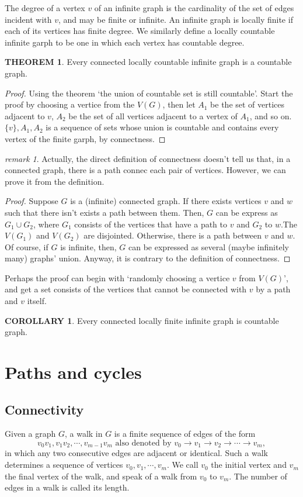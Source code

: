 \documentclass[a4paper,11pt]{article}%
\theoremstyle{remark}
\newtheorem*{remark}{remark}
\theoremstyle{definition}
\newtheorem{theorem}{THEOREM}[section]
\theoremstyle{definition}
\newtheorem{corollary}{COROLLARY}[section]
\theoremstyle{definition}
\theoremstyle{definition}
\theoremstyle{plain}
\theoremstyle{definition}
\begin{document}
The degree of a vertex $v$ of an infinite graph is the cardinality of the set 
of edges incident with $v$, and may be finite or infinite. An infinite graph 
is locally finite if each of its vertices has finite degree. We similarly define 
a locally countable infinite garph to be one in which each vertex has countable 
degree.
\begin{theorem}
    Every connected locally countable infinite graph is a countable graph.
\end{theorem}
\begin{proof}
    Using the theorem `the union of countable set is still countable'.
    Start the proof by choosing a vertice from the $V(G)$, then let $A_1$
    be the set of vertices adjacent to $v$, $A_2$ be the set of all vertices adjacent
    to a vertex of $A_1$, and so on. $\{v\},A_1,A_2$ is a sequence of sets whose
    union is countable and contains every vertex of the finite garph, by connectness.
\end{proof}
\begin{remark}
    Actually, the direct definition of connectness doesn't tell us that, 
    in a connected graph, there is a path connec each pair of vertices.
    However, we can prove it from the definition.
\begin{proof}
    Suppose $G$ is a (infinite) connected graph. If there exists vertices $v$
    and $w$ such that there isn't exists a path between them. Then, 
    $G$ can be express as $G_1\cup G_2$, where $G_1$ consists of the 
    vertices that have a path to $v$ and $G_2$ to $w$.The $V(G_1)$ and $V(G_2)$
    are disjointed. Otherwise, there is a path between $v$ and $w$.
    Of course, if $G$ is infinite, then, $G$ can be expressed as 
    several (maybe infinitely many) graphs' union. Anyway, it is contrary to 
    the definition of connectness.
\end{proof}
Perhaps the proof can begin with `randomly choosing a vertice $v$ from $V(G)$',
and get a set consists of the vertices that cannot be connected with $v$
by a path and $v$ itself.
\end{remark}
\begin{corollary}
    Every connected locally finite infinite graph is countable graph.
\end{corollary}
\section{Paths and cycles}
\subsection{Connectivity}
Given a graph $G$, a walk in $G$ is a finite sequence of edges of the form 
\[v_0v_1,v_1v_2,\cdots,v_{m-1}v_m \text{ also denoted by }v_0\rightarrow v_1\rightarrow v_2\rightarrow\cdots\rightarrow v_m,\]
in which any two consecutive edges are adjacent or identical. 
Such a walk determines a sequence of vertices $v_0,v_1,\cdots,v_m$. We call
$v_0$ the initial vertex and $v_m$ the final vertex of the walk, and speak of 
a walk from $v_0$ to $v_m$. The number of edges in a walk is called its 
length.
\end{document}
